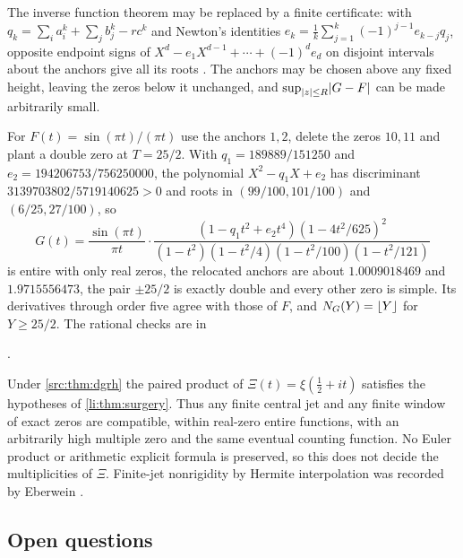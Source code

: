 The inverse function theorem may be replaced by a finite certificate: with
$q_k=\sum_ia_i^k+\sum_jb_j^k-rc^k$ and Newton's identities $e_k=\frac1k\sum_{j=1}^k(-1)^{j-1}e_{k-j}q_j$,
opposite endpoint signs of $X^d-e_1X^{d-1}+\cdots+(-1)^de_d$ on disjoint intervals about the anchors
give all its roots \cite{MelanovaSturmfelsWinter2021Recovery}. The anchors may be chosen above any
fixed height, leaving the zeros below it unchanged, and $\sup_{\lvert z\rvert\le R}\lvert G-F\rvert$ can be made
arbitrarily small.

\begin{example}\label{li:ex:surgery}
For $F(t)=\sin(\pi t)/(\pi t)$ use the anchors $1,2$, delete the zeros $10,11$ and plant a double
zero at $T=25/2$. With $q_1=189889/151250$ and $e_2=194206753/756250000$, the polynomial
$X^2-q_1X+e_2$ has discriminant $3139703802/5719140625>0$ and roots in $(99/100,101/100)$ and
$(6/25,27/100)$, so
\[
 G(t)=\frac{\sin(\pi t)}{\pi t}\cdot
 \frac{(1-q_1t^2+e_2t^4)(1-4t^2/625)^2}{(1-t^2)(1-t^2/4)(1-t^2/100)(1-t^2/121)}
\]
is entire with only real zeros, the relocated anchors are about $1.0009018469$ and $1.9715556473$,
the pair $\pm25/2$ is exactly double and every other zero is simple. Its derivatives through order
five agree with those of $F$, and $N_G(Y)=\lfloor Y\rfloor$ for $Y\ge25/2$. The rational checks are in
\begin{center}
.
\end{center}
\end{example}

Under \cref{src:thm:dgrh} the paired product of $\Xi(t)=\xi(\frac12+it)$ satisfies the hypotheses of
\cref{li:thm:surgery}. Thus any finite central jet and any finite window of exact zeros are
compatible, within real-zero entire functions, with an arbitrarily high multiple zero and the same
eventual counting function. No Euler product or arithmetic explicit formula is preserved, so this
does not decide the multiplicities of $\Xi$. Finite-jet nonrigidity by Hermite interpolation was
recorded by Eberwein \cite{Eberwein2026Truncated}.

\subsection{Open questions}\label{li:sec:open}

